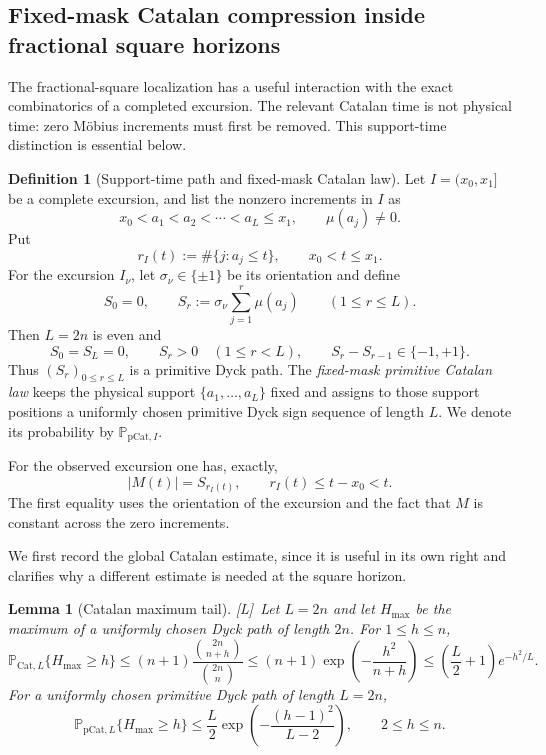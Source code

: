 \documentclass[11pt]{amsart}
\numberwithin{equation}{section}
\theoremstyle{plain}
\newtheorem{lemma}[theorem]{Lemma}
\theoremstyle{definition}
\newtheorem{definition}[theorem]{Definition}
\theoremstyle{remark}
\newcommand{\tagL}{\textup{[L]}}
\begin{document}
\subsection{Fixed-mask Catalan compression inside fractional square horizons}
\label{subsec:catalan-square}

The fractional-square localization has a useful interaction with the exact
combinatorics of a completed excursion.  The relevant Catalan time is not
physical time: zero M\"obius increments must first be removed.  This
support-time distinction is essential below.

\begin{definition}[Support-time path and fixed-mask Catalan law]
\label{def:support-catalan}
Let $I=(x_0,x_1]$ be a complete excursion, and list the nonzero increments in
$I$ as
\[
 x_0<a_1<a_2<\cdots<a_L\le x_1,
 \qquad \mu(a_j)\ne0.
\]
Put
\[
 r_I(t):=\#\{j:a_j\le t\},\qquad x_0<t\le x_1.
\]
For the excursion $I_\nu$, let $\sigma_\nu\in\{\pm1\}$ be its orientation and define
\[
 S_0=0,\qquad
 S_r:=\sigma_\nu\sum_{j=1}^r\mu(a_j)\qquad(1\le r\le L).
\]
Then $L=2n$ is even and
\[
 S_0=S_L=0,\qquad S_r>0\quad(1\le r<L),\qquad
 S_r-S_{r-1}\in\{-1,+1\}.
\]
Thus $(S_r)_{0\le r\le L}$ is a primitive Dyck path.  The
\emph{fixed-mask primitive Catalan law} keeps the physical support
$\{a_1,\dots,a_L\}$ fixed and assigns to those support positions a uniformly
chosen primitive Dyck sign sequence of length $L$.  We denote its probability
by $\mathbb P_{\mathrm{pCat},I}$.
\end{definition}

For the observed excursion one has, exactly,
\begin{equation}
\label{eq:support-time-height}
 |M(t)|=S_{r_I(t)},
 \qquad
 r_I(t)\le t-x_0<t.
\end{equation}
The first equality uses the orientation of the excursion and the fact that
$M$ is constant across the zero increments.

We first record the global Catalan estimate, since it is useful in its own
right and clarifies why a different estimate is needed at the square
horizon.

\begin{lemma}[Catalan maximum tail]
\label{lem:catalan-max-tail}
\tagL\ Let $L=2n$ and let $H_{\max}$ be the maximum of a uniformly chosen Dyck path
of length $2n$.  For $1\le h\le n$,
\begin{equation}
\label{eq:catalan-max-tail}
 \mathbb P_{\mathrm{Cat},L}\{H_{\max}\ge h\}
 \le (n+1)\frac{\binom{2n}{n+h}}{\binom{2n}{n}}
 \le (n+1)\exp\!\left(-\frac{h^2}{n+h}\right)
 \le \left(\frac L2+1\right)e^{-h^2/L}.
\end{equation}
For a uniformly chosen primitive Dyck path of length $L=2n$,
\begin{equation}
\label{eq:primitive-catalan-max-tail}
 \mathbb P_{\mathrm{pCat},L}\{H_{\max}\ge h\}
 \le \frac L2\exp\!\left(-\frac{(h-1)^2}{L-2}\right),
 \qquad 2\le h\le n.
\end{equation}
\end{lemma}
\end{document}
